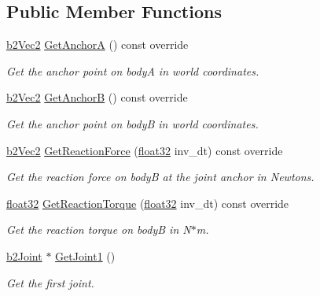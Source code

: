 \subsection*{Public Member Functions}
\begin{DoxyCompactItemize}
\item 
\mbox{\hyperlink{structb2_vec2}{b2\+Vec2}} \mbox{\hyperlink{classb2_gear_joint_a2928d2e9eac9137808537faa9b30a649}{Get\+AnchorA}} () const override
\begin{DoxyCompactList}\small\item\em Get the anchor point on bodyA in world coordinates. \end{DoxyCompactList}\item 
\mbox{\hyperlink{structb2_vec2}{b2\+Vec2}} \mbox{\hyperlink{classb2_gear_joint_a3d24a3265e64f36017404a36abcb7889}{Get\+AnchorB}} () const override
\begin{DoxyCompactList}\small\item\em Get the anchor point on bodyB in world coordinates. \end{DoxyCompactList}\item 
\mbox{\hyperlink{structb2_vec2}{b2\+Vec2}} \mbox{\hyperlink{classb2_gear_joint_aa1dc4c7c58d8ee656726c372edb7abcd}{Get\+Reaction\+Force}} (\mbox{\hyperlink{b2_settings_8h_aacdc525d6f7bddb3ae95d5c311bd06a1}{float32}} inv\+\_\+dt) const override
\begin{DoxyCompactList}\small\item\em Get the reaction force on bodyB at the joint anchor in Newtons. \end{DoxyCompactList}\item 
\mbox{\hyperlink{b2_settings_8h_aacdc525d6f7bddb3ae95d5c311bd06a1}{float32}} \mbox{\hyperlink{classb2_gear_joint_a6c0f2f34c087085202b1a9506cd48fd1}{Get\+Reaction\+Torque}} (\mbox{\hyperlink{b2_settings_8h_aacdc525d6f7bddb3ae95d5c311bd06a1}{float32}} inv\+\_\+dt) const override
\begin{DoxyCompactList}\small\item\em Get the reaction torque on bodyB in N$\ast$m. \end{DoxyCompactList}\item 
\mbox{\hyperlink{classb2_joint}{b2\+Joint}} $\ast$ \mbox{\hyperlink{classb2_gear_joint_acd3fb38982319f387d1eb7aeddd5311f}{Get\+Joint1}} ()
\begin{DoxyCompactList}\small\item\em Get the first joint. \end{DoxyCompactList}\item 

\end{DoxyCompactItemize}
